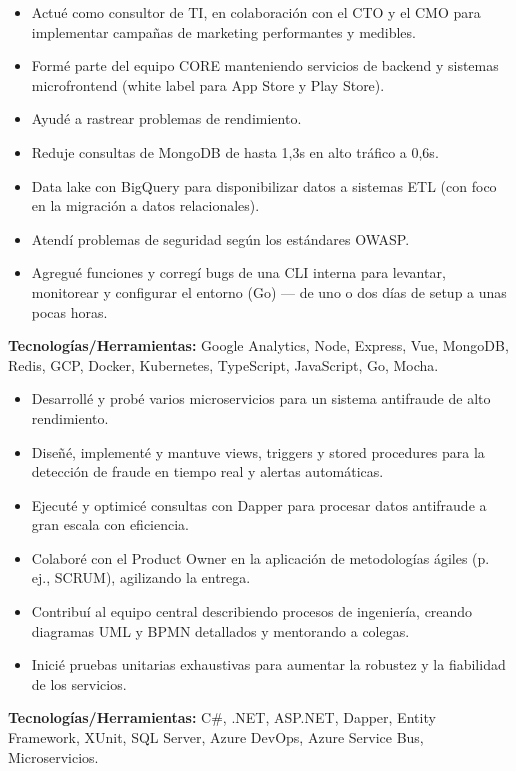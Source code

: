 \documentclass[10pt,a4paper]{altacv}
\begin{document}
\begin{itemize}
    \setlength{\itemindent}{0.5em}
    \item[--] Actué como consultor de TI, en colaboración con el CTO y el CMO para implementar campañas de marketing performantes y medibles.
    \item[--] Formé parte del equipo CORE manteniendo servicios de backend y sistemas microfrontend (white label para App Store y Play Store).
    \item[--] Ayudé a rastrear problemas de rendimiento.
    \item[--] Reduje consultas de MongoDB de hasta 1,3s en alto tráfico a 0,6s.
    \item[--] Data lake con BigQuery para disponibilizar datos a sistemas ETL (con foco en la migración a datos relacionales).
    \item[--] Atendí problemas de seguridad según los estándares OWASP.
    \item[--] Agregué funciones y corregí bugs de una CLI interna para levantar, monitorear y configurar el entorno (Go) — de uno o dos días de setup a unas pocas horas.
\end{itemize}
\textbf{Tecnologías/Herramientas:} Google Analytics, Node, Express, Vue, MongoDB, Redis, GCP, Docker, Kubernetes, TypeScript, JavaScript, Go, Mocha.
\vspace{5mm}


\begin{itemize}
    \setlength{\itemindent}{0.5em}
    \item[--] Desarrollé y probé varios microservicios para un sistema antifraude de alto rendimiento.
    \item[--] Diseñé, implementé y mantuve views, triggers y stored procedures para la detección de fraude en tiempo real y alertas automáticas.
    \item[--] Ejecuté y optimicé consultas con Dapper para procesar datos antifraude a gran escala con eficiencia.
    \item[--] Colaboré con el Product Owner en la aplicación de metodologías ágiles (p. ej., SCRUM), agilizando la entrega.
    \item[--] Contribuí al equipo central describiendo procesos de ingeniería, creando diagramas UML y BPMN detallados y mentorando a colegas.
    \item[--] Inicié pruebas unitarias exhaustivas para aumentar la robustez y la fiabilidad de los servicios.
\end{itemize}
\textbf{Tecnologías/Herramientas:} C\#, .NET, ASP.NET, Dapper, Entity Framework, XUnit, SQL Server, Azure DevOps, Azure Service Bus, Microservicios.
\vspace{5mm}
\end{document}
